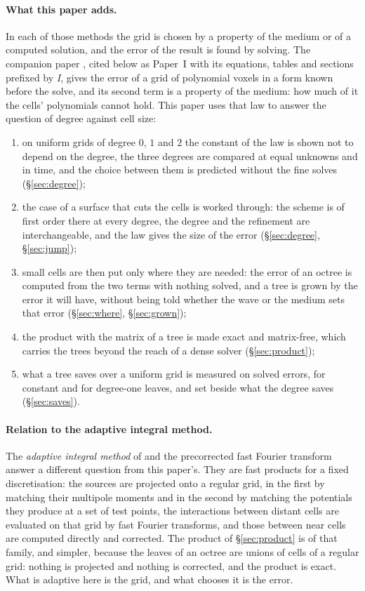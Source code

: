 \documentclass[11pt,a4paper]{article}
\begin{document}
\paragraph{What this paper adds.} In each of those methods the grid is chosen by a property of the
medium or of a computed solution, and the error of the result is found by solving. The companion paper
\citep{NestorError2026}, cited below as Paper~I with its equations, tables and sections prefixed by
\emph{I}, gives the error of a grid of polynomial voxels in a form known before the solve, and its
second term is a property of the medium: how much of it the cells' polynomials cannot hold. This paper
uses that law to answer the question of degree against cell size:
\begin{enumerate}
\item on uniform grids of degree $0$, $1$ and $2$ the constant of the law is shown not to depend on the
degree, the three degrees are compared at equal unknowns and in time, and the choice between them is
predicted without the fine solves (\S\ref{sec:degree});
\item the case of a surface that cuts the cells is worked through: the scheme is of first order there
at every degree, the degree and the refinement are interchangeable, and the law gives the size of the
error (\S\ref{sec:degree}, \S\ref{sec:jump});
\item small cells are then put only where they are needed: the error of an octree is computed from the
two terms with nothing solved, and a tree is grown by the error it will have, without being told whether
the wave or the medium sets that error (\S\ref{sec:where}, \S\ref{sec:grown});
\item the product with the matrix of a tree is made exact and matrix-free, which carries the trees beyond
the reach of a dense solver (\S\ref{sec:product});
\item what a tree saves over a uniform grid is measured on solved errors, for constant and for
degree-one leaves, and set beside what the degree saves (\S\ref{sec:saves}).
\end{enumerate}

\paragraph{Relation to the adaptive integral method.} The \emph{adaptive integral method} of
\citet{Bleszynski1996} and the precorrected fast Fourier transform \citep{Phillips1997} answer a
different question from this paper's. They are fast products for a fixed discretisation: the sources are projected onto a regular grid, in the first by matching their multipole
moments and in the second by matching the potentials they produce at a set of test points, the
interactions between distant cells are evaluated on that grid by fast Fourier transforms, and those
between near cells are computed directly and corrected. The product of \S\ref{sec:product} is of that
family, and simpler, because the leaves of an octree are unions of cells of a regular grid: nothing is
projected and nothing is corrected, and the product is exact. What is adaptive here is the grid, and
what chooses it is the error.
\end{document}
